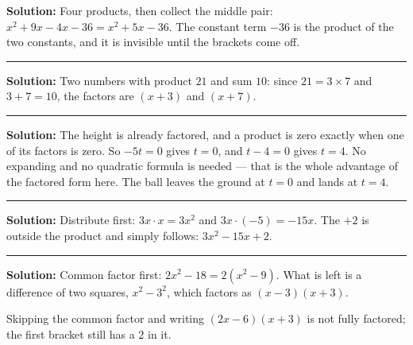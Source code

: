 \documentclass[12pt]{article}
\begin{document}



\textbf{Solution:} \quad Four products, then collect the middle pair:
$x^2 + 9x - 4x - 36 = x^2 + 5x - 36$. The constant term $-36$ is the product of the two
constants, and it is invisible until the brackets come off. 

\vspace{0.15cm}\noindent\rule{\linewidth}{0.2pt}


\textbf{Solution:} \quad Two numbers with product $21$ and sum $10$: since $21 = 3\times 7$ and
$3 + 7 = 10$, the factors are $(x + 3)$ and $(x + 7)$. 

\vspace{0.15cm}\noindent\rule{\linewidth}{0.2pt}


\textbf{Solution:} \quad The height is already factored, and a product is zero exactly when one of
its factors is zero. So $-5t = 0$ gives $t = 0$, and $t - 4 = 0$ gives $t = 4$. No expanding and no
quadratic formula is needed --- that is the whole advantage of the factored form here.
The ball leaves the ground at $t = 0$ and lands at $t = 4$.

\vspace{0.15cm}\noindent\rule{\linewidth}{0.2pt}


\textbf{Solution:} \quad Distribute first: $3x\cdot x = 3x^2$ and $3x\cdot(-5) = -15x$. The $+2$ is
outside the product and simply follows: $3x^2 - 15x + 2$. 

\vspace{0.15cm}\noindent\rule{\linewidth}{0.2pt}


\textbf{Solution:} \quad Common factor first: $2x^2 - 18 = 2(x^2 - 9)$. What is left is a
difference of two squares, $x^2 - 3^2$, which factors as $(x - 3)(x + 3)$.

\noindent Skipping the common factor and writing $(2x - 6)(x + 3)$ is not fully factored; the first
bracket still has a $2$ in it.
\end{document}
